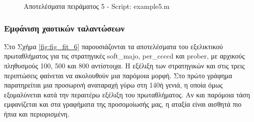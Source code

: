 \documentclass[12pt]{report}
\begin{document}
\begin{figure}[htbp]
    \caption{Αποτελέσματα πειράματος 5 - \foreignlanguage{english}{Script: example5.m}}
    \label{fig:fig_fit_5}
\end{figure}

\subsubsection{Εμφάνιση χαοτικών ταλαντώσεων}
Στο Σχήμα \ref{fig:fig_fit_6} παρουσιάζονται τα αποτελέσματα του εξελικτικού πρωταθλήματος για τις στρατηγικές \foreignlanguage{english}{soft\_majo}, \foreignlanguage{english}{per\_ccccd} και \foreignlanguage{english}{prober}, με αρχικούς πληθυσμούς 100, 500 και 800 αντίστοιχα. Η εξέλιξη των στρατηγικών και στις τρεις περιπτώσεις φαίνεται να ακολουθούν μια παρόμοια μορφή. Στο πρώτο γράφημα παρατηρείται μια προσωρινή αναταραχή γύρω στη 140ή γενιά, η οποία όμως εξομαλύνεται κατά την περαιτέρω εξέλιξη του πρωταθλήματος. Αν και παρόμοια τάση εμφανίζεται και στα γραφήματα της προσομοίωσής μας, η αταξία είναι αισθητά πιο ήπια και περιορισμένη.
\end{document}
